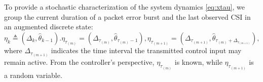 \documentclass[journal,twoside,web]{ieeecolor}
\begin{document}
To provide a stochastic characterization of the system dynamics \eqref{eq:xtau}, we group the current duration of a packet error burst and the last observed CSI in an augmented discrete state:
\begin{subequations}\label{eq:etatau}
\begin{equation}\label{eq:etatau-k}
    \eta_{k}^{} \triangleq (\mathit{\Delta}_{k},\hat{\theta}_{k-1}).
\end{equation}
\begin{equation}\label{eq:etatau-m}
    \eta_{\tau_{(m)}}^{} = (\mathit{\Delta}_{\tau_{(m)}},\hat{\theta}_{\tau_{(m)}-1}),
\end{equation}
\begin{equation}\label{eq:etatau-mp}
    \eta_{\tau_{(m+1)}}^{} = (\mathit{\Delta}_{\tau_{(m+1)}},\hat{\theta}_{\tau_{(m)}+\mathit{\Delta}_{\tau_{(m+1)}}}),
\end{equation}
\end{subequations}
where $\mathit{\Delta}_{\tau_{(m+1)}}$ indicates the time interval the transmitted control input may remain active. From the controller's perspective, $\eta_{\tau_{(m)}}^{}$ is known, while $\eta_{\tau_{(m+1)}}^{}$ is a random variable.
\end{document}
